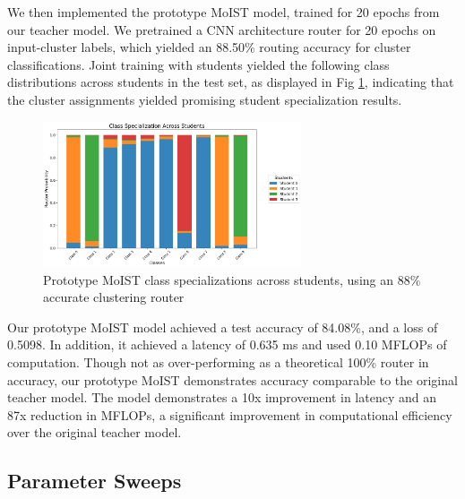 \documentclass[conference]{IEEEtran}
\begin{document}
We then implemented the prototype MoIST model, trained for 20 epochs from our teacher model. We pretrained a CNN architecture router for 20 epochs on input-cluster labels, which yielded an 88.50\% routing accuracy for cluster classifications. Joint training with students yielded the following class distributions across students in the test set, as displayed in Fig \ref{routerdist}, indicating that the cluster assignments yielded promising student specialization results.

\begin{figure}[ht!] %
  \centering
  \includegraphics[width=3in]{figures/router_specialization_baseline.png}
  \caption{Prototype MoIST class specializations across students, using an 88\% accurate clustering router}
  \label{routerdist}
\end{figure}

Our prototype MoIST model achieved a test accuracy of 84.08\%, and a loss of 0.5098. In addition, it achieved a latency of 0.635 ms and used 0.10 MFLOPs of computation. Though not as over-performing as a theoretical 100\% router in accuracy, our prototype MoIST demonstrates accuracy comparable to the original teacher model. The model demonstrates a 10x improvement in latency and an 87x reduction in MFLOPs, a significant improvement in computational efficiency over the original teacher model.

\subsection{Parameter Sweeps}
\end{document}
